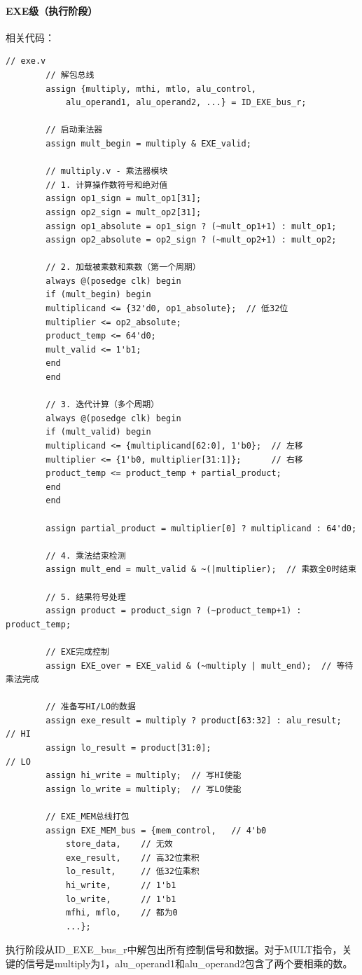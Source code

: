 \documentclass[a4paper]{article}
\begin{document}
	\paragraph{EXE级（执行阶段）}
	相关代码：
	\begin{lstlisting}[caption={EXE}]
		// exe.v
		// 解包总线
		assign {multiply, mthi, mtlo, alu_control, 
			alu_operand1, alu_operand2, ...} = ID_EXE_bus_r;
		
		// 启动乘法器
		assign mult_begin = multiply & EXE_valid;
		
		// multiply.v - 乘法器模块
		// 1. 计算操作数符号和绝对值
		assign op1_sign = mult_op1[31];
		assign op2_sign = mult_op2[31];
		assign op1_absolute = op1_sign ? (~mult_op1+1) : mult_op1;
		assign op2_absolute = op2_sign ? (~mult_op2+1) : mult_op2;
		
		// 2. 加载被乘数和乘数（第一个周期）
		always @(posedge clk) begin
		if (mult_begin) begin
		multiplicand <= {32'd0, op1_absolute};  // 低32位
		multiplier <= op2_absolute;
		product_temp <= 64'd0;
		mult_valid <= 1'b1;
		end
		end
		
		// 3. 迭代计算（多个周期）
		always @(posedge clk) begin
		if (mult_valid) begin
		multiplicand <= {multiplicand[62:0], 1'b0};  // 左移
		multiplier <= {1'b0, multiplier[31:1]};      // 右移
		product_temp <= product_temp + partial_product;
		end
		end
		
		assign partial_product = multiplier[0] ? multiplicand : 64'd0;
		
		// 4. 乘法结束检测
		assign mult_end = mult_valid & ~(|multiplier);  // 乘数全0时结束
		
		// 5. 结果符号处理
		assign product = product_sign ? (~product_temp+1) : product_temp;
		
		// EXE完成控制
		assign EXE_over = EXE_valid & (~multiply | mult_end);  // 等待乘法完成
		
		// 准备写HI/LO的数据
		assign exe_result = multiply ? product[63:32] : alu_result;  // HI
		assign lo_result = product[31:0];                             // LO
		assign hi_write = multiply;  // 写HI使能
		assign lo_write = multiply;  // 写LO使能
		
		// EXE_MEM总线打包
		assign EXE_MEM_bus = {mem_control,   // 4'b0
			store_data,    // 无效
			exe_result,    // 高32位乘积
			lo_result,     // 低32位乘积
			hi_write,      // 1'b1
			lo_write,      // 1'b1
			mfhi, mflo,    // 都为0
			...};
	\end{lstlisting}
	
	执行阶段从ID\_EXE\_bus\_r中解包出所有控制信号和数据。对于MULT指令，关键的信号是multiply为1，alu\_operand1和alu\_operand2包含了两个要相乘的数。
	
\end{document}
